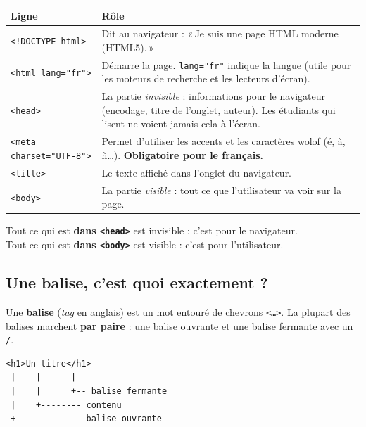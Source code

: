 \documentclass[11pt,a4paper]{article}
\begin{document}
\begin{center}
\begin{tabular}{@{}lp{9cm}@{}}
\toprule
\textbf{Ligne} & \textbf{Rôle} \\
\midrule
\texttt{<!DOCTYPE html>} & Dit au navigateur : «\,Je suis une page HTML moderne (HTML5).\,» \\
\addlinespace
\texttt{<html lang="fr">} & Démarre la page. \texttt{lang="fr"} indique la langue (utile pour les moteurs de recherche et les lecteurs d'écran). \\
\addlinespace
\texttt{<head>} & La partie \emph{invisible} : informations pour le navigateur (encodage, titre de l'onglet, auteur). Les étudiants qui lisent ne voient jamais cela à l'écran. \\
\addlinespace
\texttt{<meta charset="UTF-8">} & Permet d'utiliser les accents et les caractères wolof (é, à, ñ\ldots). \textbf{Obligatoire pour le français.} \\
\addlinespace
\texttt{<title>} & Le texte affiché dans l'onglet du navigateur. \\
\addlinespace
\texttt{<body>} & La partie \emph{visible} : tout ce que l'utilisateur va voir sur la page. \\
\bottomrule
\end{tabular}
\end{center}

\begin{retenirbox}[À retenir]
Tout ce qui est \textbf{dans \texttt{<head>}} est invisible : c'est pour
le navigateur.\\
Tout ce qui est \textbf{dans \texttt{<body>}} est visible : c'est pour
l'utilisateur.
\end{retenirbox}

\subsection{Une balise, c'est quoi exactement ?}

Une \textbf{balise} (\emph{tag} en anglais) est un mot entouré de chevrons
\texttt{<\ldots>}. La plupart des balises marchent \textbf{par paire} : une
balise ouvrante et une balise fermante avec un \texttt{/}.

\begin{lstlisting}[language=HTML5]
<h1>Un titre</h1>
 |    |      |
 |    |      +-- balise fermante
 |    +-------- contenu
 +------------- balise ouvrante
\end{lstlisting}
\end{document}
